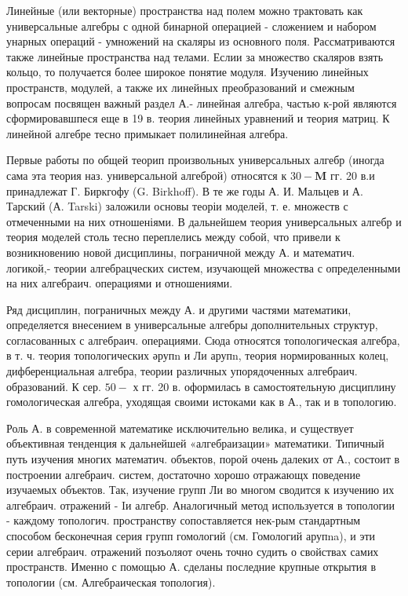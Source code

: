 \documentclass[10pt]{article}
\begin{document}
Линейные (или векторные) пространства над полем можно трактовать как универсальные алгебры с одной бинарной операцией - сложением и набором унарных операций - умножений на скаляры из основного поля. Рассматриваются также линейные пространства над телами. Еслии за множество скаляров взять кольцо, то получается более широкое понятие модуля. Изучению линейных пространств, модулей, а также их линейных преобразований и смежным вопросам посвящен важный раздел А.- линейная алгебра, частью к-рой являются сформировавшпеся еще в 19 в. теория линейных уравнений и теория матриц. К линейной алгебре тесно примыкает полилинейная алгебра.



Первые работы по общей теорип произвольных универсальных алгебр (иногда сама эта теория наз. универсальной алгеброй) относятся к $30-\mathbf{M}$ гг. 20 в.и принадлежат Г. Биркгофу (G. Birkhoff). В те же годы А. И. Мальцев и А. Тарский (А. Tarski) заложили основы теоріи моделей, т. е. множеств с отмеченными на них отношеніями. В дальнейшем теория универсальных алгебр и теория моделей столь тесно переплелись между собой, что привели к возникновению новой дисциплины, пограничной между А. и математич. логикой,- теории алгебрацческих систем, изучающей множества с определенными на них алгебраич. операциями и отношениями.



Ряд дисциплин, пограничных между А. и другими частями математики, определяется внесением в универсальные алгебры дополнительных структур, согласованных с алгебраич. операциями. Сюда относятся топологическая алгебра, в т. ч. теория топологических әрупn и Ли арупn, теория нормированных колец, дифберенциальная алгебра, теории различных упорядоченных алгебраич. образований. $К$ сер. $50-$ х гг. 20 в. оформилась в самостоятельную дисциплину гомологическая алгебра, уходящая своими истоками как в А., так и в топологию.



Роль А. в современной математике исключительно велика, и существует объективная тенденция к дальнейшей «алгебраизации» математики. Типичный путь изучения многих математич. объектов, порой очень далеких от А., состоит в построении алгебраич. систем, достаточно хорошо отражающх поведение изучаемых объектов. Так, изучение групп Ли во многом сводится к изучению их алгебраич. отражений - Iи алгебр. Аналогичный метод используется в топологии - каждому топологич. пространству сопоставляется нек-рым стандартным способом бесконечная серия групп гомологий (см. Гомологий арупna), и эти серии алгебраич. отражений позъоляот очень точно судить о свойствах самих пространств. Именно с помощью А. сделаны последние крупные открытия в топологии (см. Алгебраическая топология).
\end{document}
